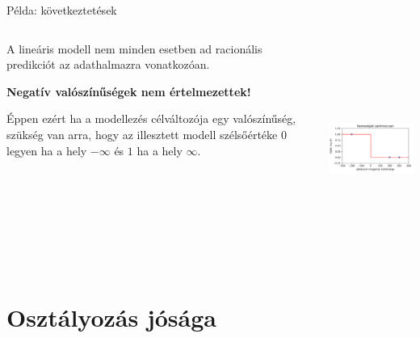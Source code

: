\documentclass[english, aspectratio=169]{beamer}
\makeatletter
\let\origtableofcontents=\tableofcontents
\def\tableofcontents{\@ifnextchar[{\origtableofcontents}{\gobbletableofcontents}}
\def\gobbletableofcontents#1{\origtableofcontents}
\makeatother
\begin{document}
\begin{frame}{Példa: következtetések}
\begin{columns}
\begin{column}{.5\textwidth}
A lineáris modell nem minden esetben ad racionális predikciót az adathalmazra vonatkozóan.\par\smallskip
\textbf{Negatív valószínűségek nem értelmezettek!}\par\smallskip
Éppen ezért ha a modellezés célváltozója egy valószínűség, szükség van arra, hogy az illesztett modell szélsőértéke $0$ legyen ha a hely $-\infty$ és $1$ ha a hely $\infty$.
\end{column}
\begin{column}{.5\textwidth}
\begin{center}
\includegraphics[width=7cm, height=7cm, keepaspectratio]{images/osztalyozas_14.png}
\end{center}
\end{column}
\end{columns}
\end{frame}

\section{Osztályozás jósága}

\begin{frame}
\tableofcontents[currentsection]
\end{frame}
\end{document}

